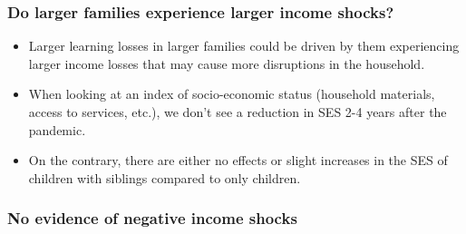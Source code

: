 \documentclass{beamer}
\begin{document}

\begin{frame}
    \label{frame:incomeshocks_intro}
    \frametitle{Do larger families experience larger income shocks?}
    \begin{itemize}
        \item Larger learning losses in larger families could be driven by them experiencing larger income losses that may cause more disruptions in the household.
        \item When looking at an index of socio-economic status (household materials, access to services, etc.), we don't see a reduction in SES 2-4 years after the pandemic.
        \item On the contrary, there are either no effects or slight increases in the SES of children with siblings compared to only  children.
    \end{itemize}

\end{frame}


\begin{frame}
    \label{frame:incomeshocks}
    \frametitle{No evidence of negative income shocks}
     

     {
    }

    \begin{flushleft}
        \hyperlink{frame:incomeshocks_siblings}{}
    \end{flushleft}  

   
\end{frame}
\end{document}

